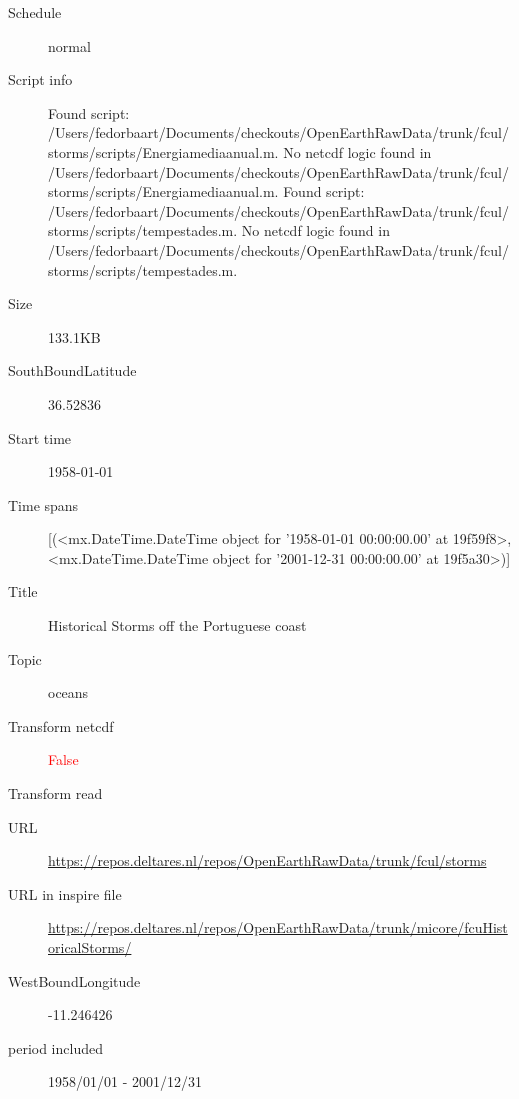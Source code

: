 \documentclass[9]{report}
\begin{document}
\begin{description}
\begin{verbatim}
\end{verbatim}
  \item[Schedule] normal
  \item[Script info] Found script: /Users/fedorbaart/Documents/checkouts/OpenEarthRawData/trunk/fcul/storms/scripts/Energiamediaanual.m.
No netcdf logic found in /Users/fedorbaart/Documents/checkouts/OpenEarthRawData/trunk/fcul/storms/scripts/Energiamediaanual.m.
Found script: /Users/fedorbaart/Documents/checkouts/OpenEarthRawData/trunk/fcul/storms/scripts/tempestades.m.
No netcdf logic found in /Users/fedorbaart/Documents/checkouts/OpenEarthRawData/trunk/fcul/storms/scripts/tempestades.m.
  \item[Size] 133.1KB
  \item[SouthBoundLatitude] 36.52836
  \item[Start time] 1958-01-01
  \item[Time spans] [(<mx.DateTime.DateTime object for '1958-01-01 00:00:00.00' at 19f59f8>, <mx.DateTime.DateTime object for '2001-12-31 00:00:00.00' at 19f5a30>)]
  \item[Title]  Historical Storms off the Portuguese coast 
  \item[Topic] oceans
  \item[Transform netcdf] \textcolor{red}{False}
  \item[Transform read] \textcolor{blue}{}
  \item[URL] \href{https://repos.deltares.nl/repos/OpenEarthRawData/trunk/fcul/storms}{https://repos.deltares.nl/repos/OpenEarthRawData/trunk/fcul/storms}
  \item[URL in inspire file] \href{https://repos.deltares.nl/repos/OpenEarthRawData/trunk/micore/fcuHistoricalStorms/}{https://repos.deltares.nl/repos/OpenEarthRawData/trunk/micore/fcuHistoricalStorms/}
  \item[WestBoundLongitude] -11.246426
  \item[period included] 1958/01/01 - 2001/12/31
\end{description}
\end{document}
